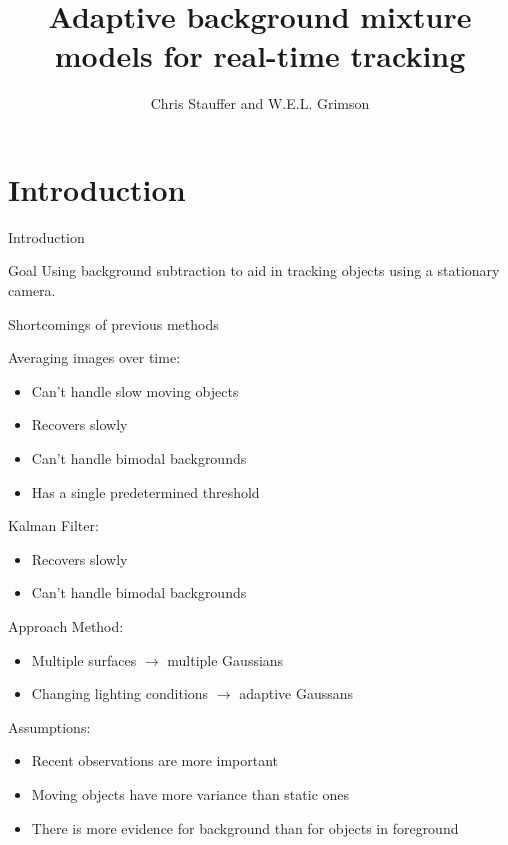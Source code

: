 \documentclass{beamer}
\title[Adaptive background mixture models for real-time tracking]
{Adaptive background mixture models for real-time tracking}
\author[Chris Stauffer and W.E.L. Grimson] %
{Chris Stauffer and W.E.L. Grimson}
\institute[University of Amsterdam] %
{
  Chiel Kooijman and Auke Wiggers \\
  Computer Vision  \\
  Artificial Intelligence \\
  Faculty of Science (FNWI) \\
  University of Amsterdam
}
\begin{document}
\maketitle

\section{Introduction}
\begin{frame}{Introduction}
\begin{block}{Goal}
Using background subtraction to aid in tracking objects using a stationary camera.
\end{block}

\end{frame}

\begin{frame}{Shortcomings of previous methods}

Averaging images over time:
\begin{itemize}
\item Can't handle slow moving objects
\item Recovers slowly
\item Can't handle bimodal backgrounds
\item Has a single predetermined threshold
\end{itemize}

Kalman Filter:
\begin{itemize}
\item Recovers slowly
\item Can't handle bimodal backgrounds
\end{itemize}
\end{frame}

\begin{frame}{Approach}
Method:
\begin{itemize}
\item Multiple surfaces $\rightarrow$ multiple Gaussians
\item Changing lighting conditions $\rightarrow$ adaptive Gaussans
\end{itemize}

Assumptions:
\begin{itemize}
\item Recent observations are more important
\item Moving objects have more variance than static ones
\item There is more evidence for background than for objects in foreground
\end{itemize}

\end{frame}
\end{document}
